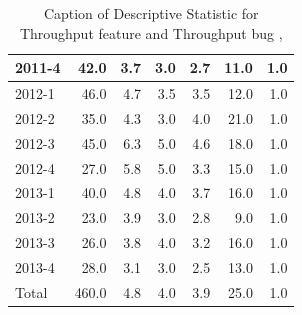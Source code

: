 \documentclass[UKenglish]{ifimaster}  %
\begin{document}
\begin{table}[!htbp]
\begin{adjustwidth}{-2.5cm}{}
{{\begin{tabular}{ | l | r | r | r | r | r | r | }
2011-4 & 42.0 & 3.7 & 3.0 & 2.7 & 11.0 & 1.0\\ \hline
2012-1 & 46.0 & 4.7 & 3.5 & 3.5 & 12.0 & 1.0\\ \hline
2012-2 & 35.0 & 4.3 & 3.0 & 4.0 & 21.0 & 1.0\\ \hline
2012-3 & 45.0 & 6.3 & 5.0 & 4.6 & 18.0 & 1.0\\ \hline
2012-4 & 27.0 & 5.8 & 5.0 & 3.3 & 15.0 & 1.0\\ \hline
2013-1 & 40.0 & 4.8 & 4.0 & 3.7 & 16.0 & 1.0\\ \hline
2013-2 & 23.0 & 3.9 & 3.0 & 2.8 & 9.0 & 1.0\\ \hline
2013-3 & 26.0 & 3.8 & 4.0 & 3.2 & 16.0 & 1.0\\ \hline
2013-4 & 28.0 & 3.1 & 3.0 & 2.5 & 13.0 & 1.0\\ \hline
Total & 460.0 & 4.8 & 4.0 & 3.9 & 25.0 & 1.0\\ \hline
\end{tabular}
}
}
\end{adjustwidth}
\caption[Optional caption for list of figures]{Caption of Descriptive Statistic for Throughput feature and Throughput bug  , }
\label{DS:2:2}
\end{table}
\end{document}
